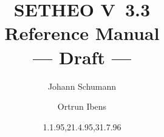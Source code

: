 \documentclass[12pt,twoside]{report}
\begin{document}
\newdimen\templength
\def\setleftmarginwidth#1{\templength=#1\relax
    \leftmarginwidth=\templength
    \textwidth=\fullwidth \advance\textwidth by -\templength
    \oddsidemargin=\leftmarginwidth \advance\oddsidemargin by -3mm
    \evensidemargin=\oddsidemargin
    \marginparwidth=\leftmarginwidth \advance\marginparwidth by -\marginparsep
    \hsize=\textwidth \linewidth=\textwidth \columnwidth=\textwidth }



     
\title{{\huge\bf SETHEO V~3.3}\\
Reference Manual\\
--- Draft ---}

\author{Johann Schumann \and Ortrun Ibens}

\date{{\tiny 1.1.95,21.4.95},31.7.96}

%
%
%
\def\SAM{{\sc S\kern-.13em\lower.45ex\hbox{A}\kern-.13emM}}
\def\SETHEO{{\sc SETHEO}}
%
\newcommand{\en}{\enspace}
\newcommand{\SE}{SETHEO}
\newcommand{\Se}{{\bf Setheo}}
\newcommand{\se}{{\bf setheo}}
\newcommand{\Xs}{{\bf Xsetheo}}
\newcommand{\xs}{{\bf xsetheo}}
\newcommand{\Sam}{{\bf Sam}}
\newcommand{\sam}{{\bf sam}}
\newcommand{\Wasm}{{\bf Wasm}}
\newcommand{\wasm}{{\bf wasm}}
\newcommand{\Inw}{{\bf Inwasm}}
\newcommand{\inw}{{\bf inwasm}}
\newcommand{\rc}{{\bf rctheo}}
\newcommand{\Rc}{{\bf Rctheo}}
\newcommand{\LOP}{LOP}
\newcommand{\Plop}{{\bf Plop}}
\newcommand{\plop}{{\bf plop}}
\newcommand{\Clop}{{\bf Clop}}
\newcommand{\clop}{{\bf clop}}
\newcommand{\Xp}{{\bf Xptree}}
\newcommand{\xp}{{\bf xptree}}
\newcommand{\lb}{{\boldmath $[$}}
\newcommand{\rb}{{\boldmath $]$}}
\newcommand{\Cv}{{\bf {\boldmath $\langle$}Ctrl{\boldmath $\rangle$}--v}}
\newcommand{\Cc}{{\bf {\boldmath $\langle$}Ctrl{\boldmath $\rangle$}--c}}
\newcommand{\qm}{{\bf {\boldmath $\langle$}?{\boldmath $\rangle$}}}

\newtheorem{remark}{Remark}
\newtheorem{definition}{Definition}[section]
\newtheorem{theorem}{Theorem}[section]
% 
\maketitle



\end{document}
